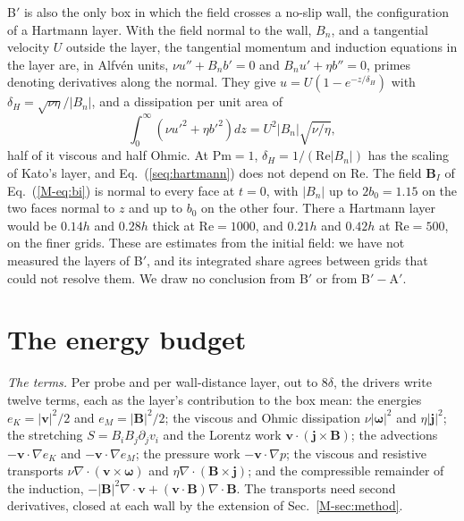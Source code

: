 \documentclass[aip,pop,reprint,amsmath,amssymb,superscriptaddress,floatfix]{revtex4-2}
\newcommand{\Rey}{\mathrm{Re}}
\newcommand{\vv}{\bm{v}}
\newcommand{\BB}{\bm{B}}
\begin{document}
B$'$ is also the only box in which the field crosses a no-slip wall, the
configuration of a Hartmann layer.\cite{sommeria1982,knaepen2008} With the field
normal to the wall, $B_n$, and a tangential velocity $U$ outside the layer, the
tangential momentum and induction equations in the layer are, in Alfv\'en units,
$\nu u''+B_nb'=0$ and $B_nu'+\eta b''=0$, primes denoting derivatives along the
normal. They give $u=U(1-e^{-z/\delta_H})$ with $\delta_H=\sqrt{\nu\eta}/|B_n|$, and a
dissipation per unit area of
\begin{equation}
  \int_0^\infty\!\left(\nu u'^2+\eta b'^2\right)dz = U^2|B_n|\sqrt{\nu/\eta},
  \label{seq:hartmann}
\end{equation}
half of it viscous and half Ohmic. At $\mathrm{Pm}=1$, $\delta_H=1/(\Rey|B_n|)$ has
the scaling of Kato's layer, and Eq.~(\ref{seq:hartmann}) does not depend on
$\Rey$. The field $\BB_I$ of Eq.~(\ref{M-eq:bi}) is normal to every face at $t=0$, with
$|B_n|$ up to $2b_0=1.15$ on the two faces normal to $z$ and up to $b_0$ on the other
four. There a Hartmann layer would be $0.14h$ and $0.28h$ thick at $\Rey=1000$, and
$0.21h$ and $0.42h$ at $\Rey=500$, on the finer grids. These are estimates from the
initial field: we have not measured the layers of B$'$, and its integrated share
agrees between grids that could not resolve them. We draw no conclusion from B$'$ or
from B$'-$A$'$.

\section{The energy budget}
\label{s:budget}

\emph{The terms.} Per probe and per wall-distance layer, out to $8\delta$, the
drivers write twelve terms, each as the layer's contribution to the box mean: the
energies $e_K=|\vv|^2/2$ and $e_M=|\BB|^2/2$; the viscous and Ohmic dissipation
$\nu|\bm\omega|^2$ and $\eta|\bm{j}|^2$; the stretching $S=B_iB_j\partial_jv_i$ and
the Lorentz work $\vv\cdot(\bm{j}\times\BB)$; the advections $-\vv\cdot\nabla e_K$ and
$-\vv\cdot\nabla e_M$; the pressure work $-\vv\cdot\nabla p$; the viscous and
resistive transports $\nu\nabla\cdot(\vv\times\bm\omega)$ and
$\eta\nabla\cdot(\BB\times\bm{j})$; and the compressible remainder of the induction,
$-|\BB|^2\nabla\cdot\vv+(\vv\cdot\BB)\nabla\cdot\BB$. The transports need second
derivatives, closed at each wall by the extension of Sec.~\ref{M-sec:method}.
\end{document}
